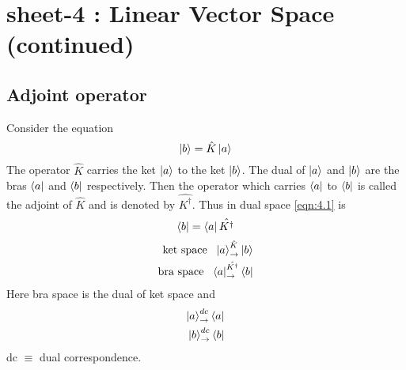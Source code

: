 \chapter{sheet-4 : Linear Vector Space (continued)}
\section{Adjoint operator}
Consider the equation
\begin{equation}\label{eqn:4.1}
\ket{b} = \hat{K} \ket{a}
\end{equation}
The operator $\hat{K}$ carries the ket $\ket{a}$ to the ket $\ket{b}$. The dual of $\ket{a}$ and $\ket{b}$ are the bras $\bra{a}$ and $\bra{b}$ respectively. Then the operator which carries $\bra{a}$ to $\bra{b}$ is called the adjoint of $\hat{K}$ and is denoted by $\hat{K^\dagger}$. Thus in dual space \ref{eqn:4.1} is
\begin{equation}\label{eqn:4.2}
\bra{b} = \bra{a} \hat{K^\dagger}
\end{equation}
\begin{align}\label{eqn:4.3-4.4}
	\text{ket space \ } \ket{a} _\rightarrow^{\hat{K}} \ket{b}\\
	\text{bra space \ } \bra{a} _\rightarrow^{\hat{K^\dagger}} \bra{b}
\end{align}
Here bra space is the dual of ket space and
\begin{align}\label{eqn:4.5-4.6}
	\ket{a} _\rightarrow^{dc} \bra{a} \\
	\ket{b} _\rightarrow^{dc} \bra{b}
\end{align}
dc $\equiv$ dual correspondence.\\

